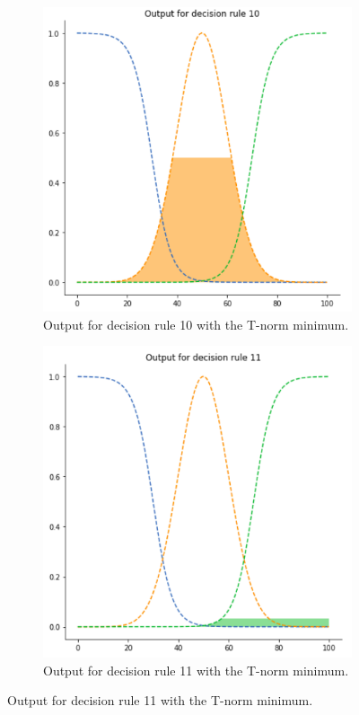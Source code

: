\begin{figure}[ht]
\begin{subfigure}{.5\textwidth}
  \centering
  \includegraphics[width=.8\linewidth]{figures/second/min1.png}  
  \caption{Output for decision rule 10 with the T-norm minimum.}
  \label{fig:2min1}
\end{subfigure}
\begin{subfigure}{.5\textwidth}
  \centering
  \includegraphics[width=.8\linewidth]{figures/second/min2.png}  
  \caption{Output for decision rule 11 with the T-norm minimum.}
  \label{fig:2min2}

\end{subfigure}
\end{figure}

